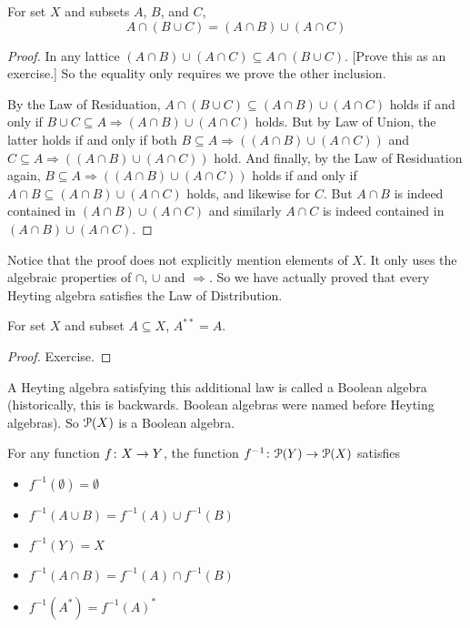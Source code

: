 \begin{lemma}
	For set $X$ and subsets $A$, $B$, and $C$,
	\[A\cap (B\cup C) = (A\cap B) \cup (A\cap C)\]
	
	\begin{proof}
		In any lattice $(A\cap B)\cup (A\cap C)\subseteq A\cap (B\cup C)$. [Prove this as an exercise.]
		So the equality only requires we prove the other inclusion.
		
		By the Law of Residuation, $A\cap (B\cup C)\subseteq (A\cap B)\cup (A\cap C)$ holds if and only if $B\cup C\subseteq A\Rightarrow (A\cap B)\cup (A\cap C)$ holds. But by Law of Union, the latter holds if and only if both $B\subseteq A\Rightarrow ((A\cap B)\cup (A\cap C))$ and $C\subseteq A\Rightarrow ((A\cap B)\cup (A\cap C))$ hold. And finally, by the Law of Residuation again, $B\subseteq A\Rightarrow ((A\cap B)\cup (A\cap C))$ holds if and only if $A\cap B\subseteq (A\cap B)\cup (A\cap C)$ holds, and likewise for $C$. But $A\cap B$ is indeed contained in $(A\cap B)\cup (A\cap C)$ and similarly $A\cap C$ is indeed contained in $(A\cap B)\cup (A\cap C)$. 
	\end{proof}
\end{lemma}

Notice that the proof does not explicitly mention elements of $X$. It only uses the algebraic properties of $\cap$, $\cup$ and $\Rightarrow$. So we have actually proved that every Heyting algebra satisfies the Law of Distribution.

\begin{lemma}
	For set $X$ and subset $A\subseteq X$, $A^{**} = A$.
	
	\begin{proof}
		Exercise.
	\end{proof}
\end{lemma}

A Heyting algebra satisfying this additional law is called a Boolean algebra (historically, this is backwards. Boolean algebras were named before Heyting algebras). So ${\mathcal{P}}(X)$ is a Boolean algebra.

\begin{lemma}
	For any function ${f}\colon{X}\to{Y}$, the function ${f^{-1}}\colon{{\mathcal{P}}(Y)}\to{{\mathcal{P}}(X)}$ satisfies
	\begin{itemize}
		\item $f^{-1}(\emptyset) = \emptyset$
		\item $f^{-1}(A\cup B) = f^{-1}(A)\cup f^{-1}(B)$
		\item $f^{-1}(Y) = X$
		\item $f^{-1}(A\cap B) = f^{-1}(A) \cap f^{-1}(B)$
		\item $f^{-1}(A^*) = f^{-1}(A)^*$
	\end{itemize}
\end{lemma}

